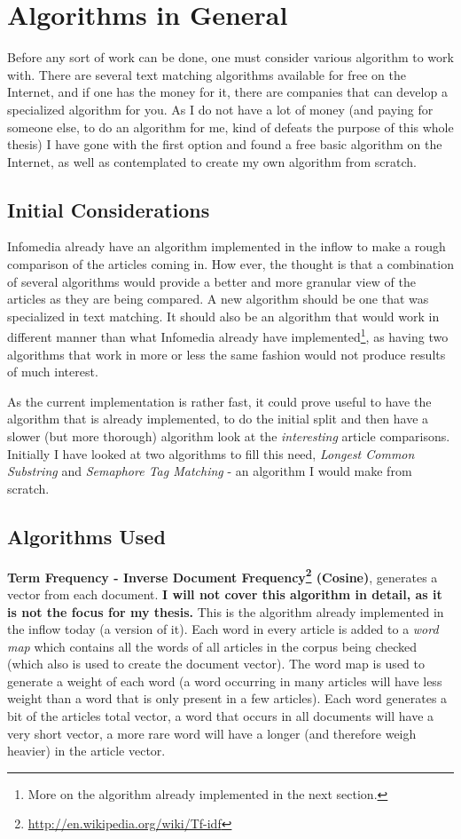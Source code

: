 \chapter{Algorithms in General}

Before any sort of work can be done, one must consider various algorithm to work with. There are several text matching algorithms available for free on the Internet, and if one has the money for it, there are companies that can develop a specialized algorithm for you. As I do not have a lot of money (and paying for someone else, to do an algorithm for me, kind of defeats the purpose of this whole thesis) I have gone with the first option and found a free basic algorithm on the Internet, as well as contemplated to create my own algorithm from scratch.

\section{Initial Considerations}
Infomedia already have an algorithm implemented in the inflow to make a rough comparison of the articles coming in. How ever, the thought is that a combination of several algorithms would provide a better and more granular view of the articles as they are being compared. A new algorithm should be one that was specialized in text matching. It should also be an algorithm that would work in different manner than what Infomedia already have implemented\footnote{More on the algorithm already implemented in the next section.}, as having two algorithms that work in more or less the same fashion would not produce results of much interest.

As the current implementation is rather fast, it could prove useful to have the algorithm that is already implemented, to do the initial split and then have a slower (but more thorough) algorithm look at the \textit{interesting} article comparisons. Initially I have looked at two algorithms to fill this need, \textit{Longest Common Substring} and \textit{Semaphore Tag Matching} - an algorithm I would make from scratch.

\section{Algorithms Used}

\textbf{Term Frequency - Inverse Document Frequency\footnote{\url{http://en.wikipedia.org/wiki/Tf-idf}} (Cosine)}, generates a vector from each document. \textbf{I will not cover this algorithm in detail, as it is not the focus for my thesis.} This is the algorithm already implemented in the inflow today (a version of it). Each word in every article is added to a \textit{word map} which contains all the words of all articles in the corpus being checked (which also is used to create the document vector). The word map is used to generate a weight of each word (a word occurring in many articles will have less weight than a word that is only present in a few articles). Each word generates a bit of the articles total vector, a word that occurs in all documents will have a very short vector, a more rare word will have a longer (and therefore weigh heavier) in the article vector.


